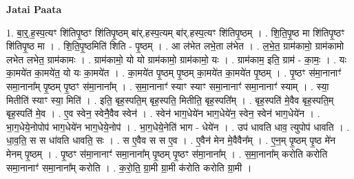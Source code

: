 \documentclass[17pt]{extarticle}
\begin{document}
\textbf{Jatai Paata} \newline

1. बा॒र्॒.ह॒स्प॒त्यꣳ शि॑तिपृ॒ष्ठꣳ शि॑तिपृ॒ष्ठम् बा॑र्.हस्प॒त्यम् बा॑र्.हस्प॒त्यꣳ शि॑तिपृ॒ष्ठम् । . शि॒ति॒पृ॒ष्ठ मा शि॑तिपृ॒ष्ठꣳ शि॑तिपृ॒ष्ठ मा । . शि॒ति॒पृ॒ष्ठमिति॑ शिति - पृ॒ष्ठम् । . आ ल॑भेत लभे॒ता ल॑भेत । . ल॒भे॒त॒ ग्राम॑कामो॒ ग्राम॑कामो लभेत लभेत॒ ग्राम॑कामः । . ग्राम॑कामो॒ यो यो ग्राम॑कामो॒ ग्राम॑कामो॒ यः । . ग्राम॑काम॒ इति॒ ग्राम॑ - का॒मः॒ । . यः का॒मये॑त का॒मये॑त॒ यो यः का॒मये॑त । . का॒मये॑त पृ॒ष्ठम् पृ॒ष्ठम् का॒मये॑त का॒मये॑त पृ॒ष्ठम् । . पृ॒ष्ठꣳ स॑मा॒नानाꣳ॑ समा॒नाना᳚म् पृ॒ष्ठम् पृ॒ष्ठꣳ स॑मा॒नाना᳚म् । . स॒मा॒नानाꣳ॑ स्याꣳ स्याꣳ समा॒नानाꣳ॑ समा॒नानाꣳ॑ स्याम् । . स्या॒ मितीति॑ स्याꣳ स्या॒ मिति॑ । . इति॒ बृह॒स्पति॒म् बृह॒स्पति॒ मितीति॒ बृह॒स्पति᳚म् । . बृह॒स्पति॑ मे॒वैव बृह॒स्पति॒म् बृह॒स्पति॑ मे॒व । . ए॒व स्वेन॒ स्वेनै॒वैव स्वेन॑ । . स्वेन॑ भाग॒धेये॑न भाग॒धेये॑न॒ स्वेन॒ स्वेन॑ भाग॒धेये॑न । . भा॒ग॒धेये॒नोपोप॑ भाग॒धेये॑न भाग॒धेये॒नोप॑ । . भा॒ग॒धेये॒नेति॑ भाग - धेये॑न । . उप॑ धावति धाव॒ त्युपोप॑ धावति । . धा॒व॒ति॒ स स धा॑वति धावति॒ सः । . स ए॒वैव स स ए॒व । . ए॒वैन॑ मेन मे॒वैवैन᳚म् । . ए॒न॒म् पृ॒ष्ठम् पृ॒ष्ठ मे॑न मेनम् पृ॒ष्ठम् । . पृ॒ष्ठꣳ स॑मा॒नानाꣳ॑ समा॒नाना᳚म् पृ॒ष्ठम् पृ॒ष्ठꣳ स॑मा॒नाना᳚म् । . स॒मा॒नाना᳚म् करोति करोति समा॒नानाꣳ॑ समा॒नाना᳚म् करोति । . क॒रो॒ति॒ ग्रा॒मी ग्रा॒मी क॑रोति करोति ग्रा॒मी । \newline
\end{document}
